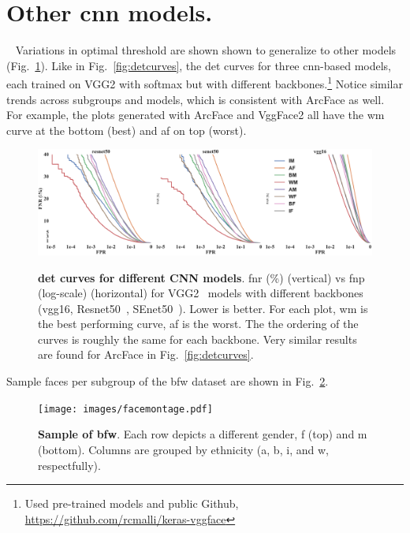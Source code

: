 




% 
\onecolumn
\renewcommand{\thesection}{\alph{section}}
\glsresetall
\setcounter{section}{0}

\section{Other \gls{cnn} models.}~\label{app:sec:other:models}
Variations in optimal threshold are shown shown to generalize to other models (Fig.~\ref{fig:sdm-appendix-a}). Like in Fig.~\ref{fig:detcurves}, the \gls{det} curves for three \gls{cnn}-based models, each trained on VGG2 with softmax but with different backbones.\footnote{Used pre-trained models and public Github, \href{https://github.com/rcmalli/keras-vggface}{https://github.com/rcmalli/keras-vggface}} Notice similar trends across subgroups and models, which is consistent with  ArcFace as well. For example, the plots generated with ArcFace and VggFace2 all have the \gls{wm} curve at the bottom (\ie best) and \gls{af} on top (\ie worst).

\begin{figure}[h!]
    \centering
    \includegraphics[width=.9\linewidth, trim={0mm 0mm 0mm 0mm},clip]{images/SDM.pdf}\\
    \caption{\textbf{\gls{det} curves for different CNN models}. \gls{fnr} (\%) (vertical) vs \gls{fnp} (log-scale)  (horizontal) for VGG2~\cite{Cao18} models with different backbones (vgg16, Resnet50~\cite{he2016deep}, SEnet50~\cite{hu2018squeeze}). Lower is better. For each plot, \gls{wm} is the best performing curve, \gls{af} is the worst. The the ordering of the curves is roughly the same for each backbone. Very similar results are found for ArcFace in Fig.~\ref{fig:detcurves}.
    }\label{fig:sdm-appendix-a}
\end{figure}

Sample faces per subgroup of the \gls{bfw} dataset are shown in Fig.~\ref{fig:montage:app}.
\begin{figure}[h!]
    \centering
    \texttt{[image: images/facemontage.pdf]}
    \caption{\textbf{Sample of \gls{bfw}}. Each row depicts a different gender, \gls{f} (top) and \gls{m} (bottom). Columns are grouped by ethnicity (\ie \gls{a}, \gls{b}, \gls{i}, and \gls{w}, respectfully).}
    \label{fig:montage:app}
\end{figure}